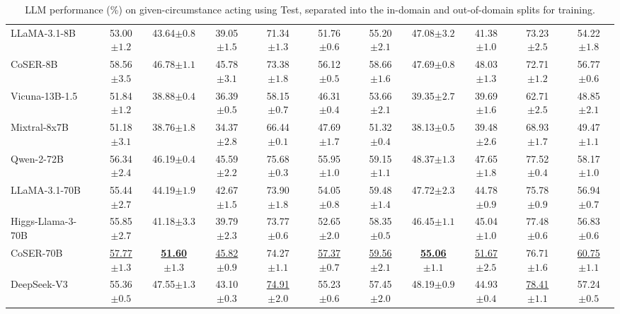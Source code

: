 \begin{table*}[htbp]
{\begin{tabular}{lcccccccccc}
LLaMA-3.1-8B & 53.00\tiny{$\pm1.2$} & 43.64\tiny{$\pm0.8$} & 39.05\tiny{$\pm1.5$} & 71.34\tiny{$\pm1.3$} & 51.76\tiny{$\pm0.6$} & 55.20\tiny{$\pm2.1$} & 47.08\tiny{$\pm3.2$} & 41.38\tiny{$\pm1.0$} & 73.23\tiny{$\pm2.5$} & 54.22\tiny{$\pm1.8$}\\
CoSER-8B & 58.56\tiny{$\pm3.5$} & 46.78\tiny{$\pm1.1$} & 45.78\tiny{$\pm3.1$} & 73.38\tiny{$\pm1.8$} & 56.12\tiny{$\pm0.5$} & 58.66\tiny{$\pm1.6$} & 47.69\tiny{$\pm0.8$} & 48.03\tiny{$\pm1.3$} & 72.71\tiny{$\pm1.2$} & 56.77\tiny{$\pm0.6$}\\
Vicuna-13B-1.5 & 51.84\tiny{$\pm1.2$} & 38.88\tiny{$\pm0.4$} & 36.39\tiny{$\pm0.5$} & 58.15\tiny{$\pm0.7$} & 46.31\tiny{$\pm0.4$} & 53.66\tiny{$\pm2.1$} & 39.35\tiny{$\pm2.7$} & 39.69\tiny{$\pm1.6$} & 62.71\tiny{$\pm2.5$} & 48.85\tiny{$\pm2.1$}\\
Mixtral-8x7B & 51.18\tiny{$\pm3.1$} & 38.76\tiny{$\pm1.8$} & 34.37\tiny{$\pm2.8$} & 66.44\tiny{$\pm0.1$} & 47.69\tiny{$\pm1.7$} & 51.32\tiny{$\pm0.4$} & 38.13\tiny{$\pm0.5$} & 39.48\tiny{$\pm2.6$} & 68.93\tiny{$\pm1.7$} & 49.47\tiny{$\pm1.1$}\\
Qwen-2-72B & 56.34\tiny{$\pm2.4$} & 46.19\tiny{$\pm0.4$} & 45.59\tiny{$\pm2.2$} & 75.68\tiny{$\pm0.3$} & 55.95\tiny{$\pm1.0$} & 59.15\tiny{$\pm1.1$} & 48.37\tiny{$\pm1.3$} & 47.65\tiny{$\pm1.8$} & 77.52\tiny{$\pm0.4$} & 58.17\tiny{$\pm1.0$}\\
LLaMA-3.1-70B & 55.44\tiny{$\pm2.7$} & 44.19\tiny{$\pm1.9$} & 42.67\tiny{$\pm1.5$} & 73.90\tiny{$\pm1.8$} & 54.05\tiny{$\pm0.8$} & 59.48\tiny{$\pm1.4$} & 47.72\tiny{$\pm2.3$} & 44.78\tiny{$\pm0.9$} & 75.78\tiny{$\pm0.9$} & 56.94\tiny{$\pm0.7$}\\
Higgs-Llama-3-70B & 55.85\tiny{$\pm2.7$} & 41.18\tiny{$\pm3.3$} & 39.79\tiny{$\pm2.3$} & 73.77\tiny{$\pm0.6$} & 52.65\tiny{$\pm2.0$} & 58.35\tiny{$\pm0.5$} & 46.45\tiny{$\pm1.1$} & 45.04\tiny{$\pm1.0$} & 77.48\tiny{$\pm0.6$} & 56.83\tiny{$\pm0.6$}\\
CoSER-70B & \underline{57.77\tiny{$\pm1.3$}} & \underline{\textbf{51.60\tiny{$\pm1.3$}}} & \underline{45.82\tiny{$\pm0.9$}} & 74.27\tiny{$\pm1.1$} & \underline{57.37\tiny{$\pm0.7$}} & \underline{59.56\tiny{$\pm2.1$}} & \underline{\textbf{55.06\tiny{$\pm1.1$}}} & \underline{51.67\tiny{$\pm2.5$}} & 76.71\tiny{$\pm1.6$} & \underline{60.75\tiny{$\pm1.1$}}\\
DeepSeek-V3 & 55.36\tiny{$\pm0.5$} & 47.55\tiny{$\pm1.3$} & 43.10\tiny{$\pm0.3$} & \underline{74.91\tiny{$\pm2.0$}} & 55.23\tiny{$\pm0.6$} & 57.45\tiny{$\pm2.0$} & 48.19\tiny{$\pm0.9$} & 44.93\tiny{$\pm0.4$} & \underline{78.41\tiny{$\pm1.1$}} & 57.24\tiny{$\pm0.5$}\\
\bottomrule
\end{tabular}}
\caption{LLM performance (\%) on given-circumstance acting using \method Test, separated into the in-domain and out-of-domain splits for \method training.}
\label{tab:exp_idood}
\end{table*}
